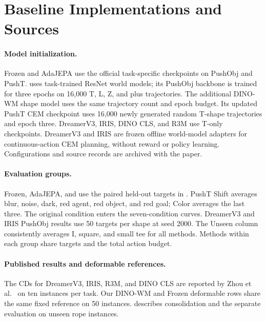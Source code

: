 \section{Baseline Implementations and Sources}
\label{app:baselines}

\paragraph{Model initialization.}
Frozen and AdaJEPA use the official task-specific checkpoints on PushObj and PushT. \ours uses task-trained ResNet world models; its PushObj backbone is trained for three epochs on 16,000 T, L, Z, and plus trajectories. The additional DINO-WM shape model uses the same trajectory count and epoch budget. Its updated PushT CEM checkpoint uses 16,000 newly generated random T-shape trajectories and epoch three. DreamerV3, IRIS, DINO CLS, and R3M use T-only checkpoints. DreamerV3 and IRIS are frozen offline world-model adapters for continuous-action CEM planning, without reward or policy learning. Configurations and source records are archived with the paper.

\paragraph{Evaluation groups.}
Frozen, AdaJEPA, and \ours use the paired held-out targets in . PushT Shift averages blur, noise, dark, red agent, red object, and red goal; Color averages the last three. The original condition enters the seven-condition curves. DreamerV3 and IRIS PushObj results use 50 targets per shape at seed 2000. The Unseen column consistently averages I, square, and small tee for all methods. Methods within each group share targets and the total action budget.

\paragraph{Published results and deformable references.}
The CDs for DreamerV3, IRIS, R3M, and DINO CLS are reported by Zhou et al.~ on ten instances per task. Our DINO-WM and Frozen deformable rows share the same fixed reference on 50 instances.  describes consolidation and the separate evaluation on unseen rope instances.
